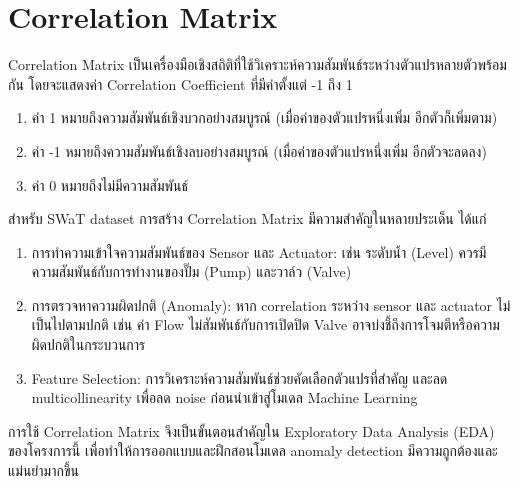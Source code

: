 \section{Correlation Matrix}
\hspace{2em} Correlation Matrix เป็นเครื่องมือเชิงสถิติที่ใช้วิเคราะห์ความสัมพันธ์ระหว่างตัวแปรหลายตัวพร้อมกัน โดยจะแสดงค่า Correlation Coefficient ที่มีค่าตั้งแต่ -1 ถึง 1
\begin{enumerate}
  \item ค่า 1 หมายถึงความสัมพันธ์เชิงบวกอย่างสมบูรณ์ (เมื่อค่าของตัวแปรหนึ่งเพิ่ม อีกตัวก็เพิ่มตาม)
  \item ค่า -1 หมายถึงความสัมพันธ์เชิงลบอย่างสมบูรณ์ (เมื่อค่าของตัวแปรหนึ่งเพิ่ม อีกตัวจะลดลง)
  \item ค่า 0 หมายถึงไม่มีความสัมพันธ์
\end{enumerate}
สำหรับ SWaT dataset การสร้าง Correlation Matrix มีความสำคัญในหลายประเด็น ได้แก่
\begin{enumerate}
  \item การทำความเข้าใจความสัมพันธ์ของ Sensor และ Actuator: เช่น ระดับน้ำ (Level) ควรมีความสัมพันธ์กับการทำงานของปั๊ม (Pump) และวาล์ว (Valve)
  \item การตรวจหาความผิดปกติ (Anomaly): หาก correlation ระหว่าง sensor และ actuator ไม่เป็นไปตามปกติ เช่น ค่า Flow ไม่สัมพันธ์กับการเปิดปิด Valve อาจบ่งชี้ถึงการโจมตีหรือความผิดปกติในกระบวนการ
  \item Feature Selection: การวิเคราะห์ความสัมพันธ์ช่วยคัดเลือกตัวแปรที่สำคัญ และลด \\ multicollinearity เพื่อลด noise ก่อนนำเข้าสู่โมเดล Machine Learning
\end{enumerate}
\indent
การใช้ Correlation Matrix จึงเป็นขั้นตอนสำคัญใน Exploratory Data Analysis (EDA) ของโครงการนี้ เพื่อทำให้การออกแบบและฝึกสอนโมเดล anomaly detection มีความถูกต้องและแม่นยำมากขึ้น


